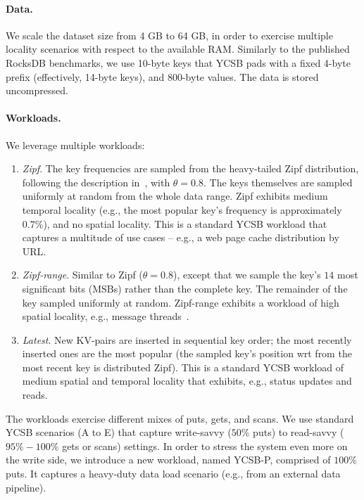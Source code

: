 \paragraph{Data.} We scale the dataset size from 4 GB to 64 GB, in order to exercise multiple locality 
scenarios with respect to the available RAM. Similarly to the published RocksDB benchmarks, we use 
10-byte keys that YCSB pads with a fixed 4-byte prefix (effectively, 14-byte keys), and 800-byte values. 
The data is stored uncompressed. 

\paragraph{Workloads.} We leverage multiple workloads: 

\begin{enumerate}
\item {\em Zipf}. The key frequencies are sampled from the heavy-tailed Zipf distribution, 
following the description in~\cite{Gray:1994:QGB:191839.191886}, with $\theta = 0.8$. 
The keys themselves are sampled uniformly at random from the whole data range. Zipf exhibits 
medium temporal locality (e.g., the most popular key's frequency is approximately $0.7\%$), 
and no spatial locality. This is a standard YCSB workload that captures a multitude of use cases 
-- e.g., a web page cache distribution by URL. 

\item {\em Zipf-range}. Similar to Zipf ($\theta=0.8$), except that we sample the key's $14$ most significant bits
(MSBs) rather than the complete key. The remainder of the key sampled uniformly at random. Zipf-range exhibits
a workload of high spatial locality, e.g., message threads~\cite{Borthakur:2011:AHG:1989323.1989438}. 

\item {\em Latest}. New KV-pairs are inserted in sequential key order; the most recently inserted ones are 
the  most popular (the sampled key's position wrt from the most recent key is distributed Zipf). This is a 
standard YCSB workload of medium spatial and temporal locality that exhibits, e.g., status updates and reads. 

\end{enumerate}

The workloads exercise different mixes of puts, gets, and scans. We use standard YCSB scenarios 
(A to E) that capture write-savvy ($50\%$ puts) to read-savvy ($95\%-100\%$ gets or scans) settings. 
In order to stress the system even more on the write side, we introduce a new workload, named 
YCSB-P, comprised of $100\%$ puts. It captures a heavy-duty data load scenario (e.g., from an 
external data pipeline). 


